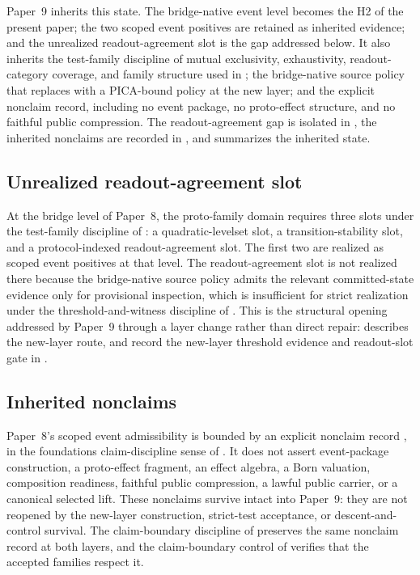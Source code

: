 \documentclass[11pt]{article}
\newcommand{\OldLayer}{H2}
\newcommand{\PaperNine}{Paper~9}
\newcommand{\PaperEight}{Paper~8}
\theoremstyle{definition}
\begin{document}
\PaperNine{} inherits this state.  The bridge-native event level
becomes the \OldLayer{} of the present paper; the two scoped event positives
are retained as inherited evidence; and the unrealized readout-agreement slot is
the gap addressed below.  It also inherits the test-family discipline of
mutual exclusivity, exhaustivity, readout-category coverage, and family
structure used in ; the bridge-native source policy
that  replaces with a PICA-bound policy at the new layer; and
the explicit nonclaim record, including no event package, no proto-effect
structure, and no faithful public compression.  The readout-agreement gap is
isolated in , the inherited nonclaims are
recorded in , and
 summarizes the inherited state.

\subsection{Unrealized readout-agreement slot}\label{subsec:unrealized-readout-slot}

At the bridge level of \PaperEight{}, the proto-family domain requires three
slots under the test-family discipline of \cite{Tsiokos2026CarrierToEvent}: a
quadratic-levelset slot, a transition-stability slot, and a protocol-indexed
readout-agreement slot.  The first two are realized as scoped event positives
at that level.  The readout-agreement slot is not realized there because the
bridge-native source policy admits the relevant committed-state evidence only
for provisional inspection, which is insufficient for strict realization under
the threshold-and-witness discipline of \cite{Tsiokos2026FoundationsII}.  This
is the structural opening addressed by \PaperNine{} through a layer change
rather than direct repair:  describes the new-layer route, and
record the new-layer threshold evidence and readout-slot gate in
.

\subsection{Inherited nonclaims}\label{subsec:inherited-nonclaims}

\PaperEight{}'s scoped event admissibility is bounded by an explicit nonclaim
record \cite{Tsiokos2026CarrierToEvent}, in the foundations claim-discipline
sense of \cite{Tsiokos2026FoundationsII}.  It does not assert event-package
construction, a proto-effect fragment, an effect algebra, a Born valuation,
composition readiness, faithful public compression, a lawful public carrier, or
a canonical selected lift.  These nonclaims survive intact into \PaperNine{}:
they are not reopened by the new-layer construction, strict-test acceptance, or
descent-and-control survival.  The claim-boundary discipline of
 preserves the same nonclaim record at
both layers, and the claim-boundary control of
 verifies that the accepted
families respect it.
\end{document}
